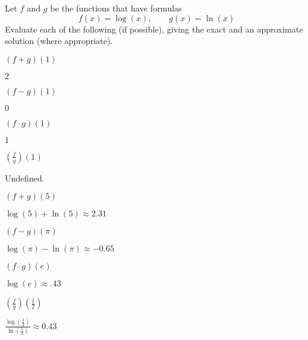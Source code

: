 \begin{exercises}
\begin{problem}
Let $f$ and $g$ be the functions that have formulas
\[
	f(x)=\log(x), \qquad g(x)=\ln(x)
\]
Evaluate each of the following (if possible), giving the exact
and an approximate solution (where appropriate).
\begin{multicols}{4}
	\begin{subproblem}
		$(f+g)(1)$ 
		\begin{shortsolution}
			$2$ 
		\end{shortsolution}
	\end{subproblem}
	\begin{subproblem}
		$(f-g)(1)$ 
		\begin{shortsolution}
			$0$ 
		\end{shortsolution}
	\end{subproblem}
	\begin{subproblem}
		$(f\cdot g)(1)$ 
		\begin{shortsolution}
			$1$ 
		\end{shortsolution}
	\end{subproblem}
	\begin{subproblem}
		$\left( \frac{f}{g} \right)(1)$ 
		\begin{shortsolution}
			Undefined. 
		\end{shortsolution}
	\end{subproblem}
	\begin{subproblem}
		$(f+g)(5)$ 
		\begin{shortsolution}
			$\log(5)+\ln(5)\approx 2.31$ 
		\end{shortsolution}
	\end{subproblem}
	\begin{subproblem}
		$(f-g)(\pi)$ 
		\begin{shortsolution}
			$\log(\pi)-\ln(\pi)\approx -0.65$       
		\end{shortsolution}
	\end{subproblem}
	\begin{subproblem}
		$(f\cdot g)(e)$ 
		\begin{shortsolution}
			$\log(e)\approx .43$  
		\end{shortsolution}
	\end{subproblem}
	\begin{subproblem}
		$\left( \frac{f}{g} \right)\left( \frac{1}{2} \right)$ 
		\begin{shortsolution}
			$\frac{\log\left( \frac{1}{2} \right)}{\ln\left( \frac{1}{2} \right)}\approx 0.43$ 
		\end{shortsolution}
	\end{subproblem}
\end{multicols}
\end{problem}

\end{exercises}
